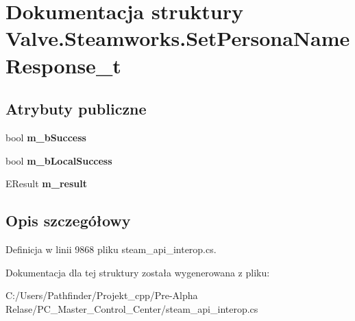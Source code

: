\hypertarget{struct_valve_1_1_steamworks_1_1_set_persona_name_response__t}{}\section{Dokumentacja struktury Valve.\+Steamworks.\+Set\+Persona\+Name\+Response\+\_\+t}
\label{struct_valve_1_1_steamworks_1_1_set_persona_name_response__t}
\subsection*{Atrybuty publiczne}
\begin{DoxyCompactItemize}
\item 
\mbox{\label{struct_valve_1_1_steamworks_1_1_set_persona_name_response__t_a345a1855a6f19feb15d443ff6b04b1b7}} 
bool {\bfseries m\+\_\+b\+Success}
\item 
\mbox{\label{struct_valve_1_1_steamworks_1_1_set_persona_name_response__t_a8eb4e63d6b807997225b2f328dc830f8}} 
bool {\bfseries m\+\_\+b\+Local\+Success}
\item 
\mbox{\label{struct_valve_1_1_steamworks_1_1_set_persona_name_response__t_aed28df88ab9e44f4ceb8b9dc45fa6812}} 
E\+Result {\bfseries m\+\_\+result}
\end{DoxyCompactItemize}


\subsection{Opis szczegółowy}


Definicja w linii 9868 pliku steam\+\_\+api\+\_\+interop.\+cs.



Dokumentacja dla tej struktury została wygenerowana z pliku\+:\begin{DoxyCompactItemize}
\item 
C\+:/\+Users/\+Pathfinder/\+Projekt\+\_\+cpp/\+Pre-\/\+Alpha Relase/\+P\+C\+\_\+\+Master\+\_\+\+Control\+\_\+\+Center/steam\+\_\+api\+\_\+interop.\+cs\end{DoxyCompactItemize}
